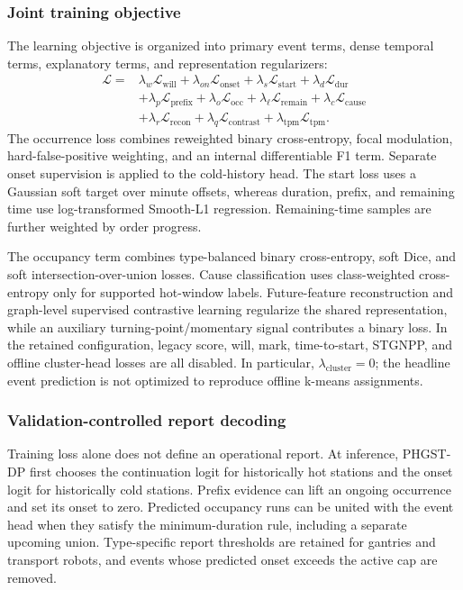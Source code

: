\documentclass[a4paper,fleqn]{cas-dc}
\begin{document}
\subsubsection{Joint training objective}

The learning objective is organized into primary event terms, dense temporal terms, explanatory terms, and representation regularizers:
\begin{equation}
\begin{aligned}
\mathcal{L}={}&
\lambda_w\mathcal{L}_{\mathrm{will}}+
\lambda_{on}\mathcal{L}_{\mathrm{onset}}+
\lambda_s\mathcal{L}_{\mathrm{start}}+
\lambda_d\mathcal{L}_{\mathrm{dur}}\\
&+\lambda_p\mathcal{L}_{\mathrm{prefix}}+
\lambda_o\mathcal{L}_{\mathrm{occ}}+
\lambda_{\ell}\mathcal{L}_{\mathrm{remain}}+
\lambda_c\mathcal{L}_{\mathrm{cause}}\\
&+\lambda_r\mathcal{L}_{\mathrm{recon}}+
\lambda_q\mathcal{L}_{\mathrm{contrast}}+
\lambda_{\mathrm{tpm}}\mathcal{L}_{\mathrm{tpm}} .
\end{aligned}
\end{equation}
The occurrence loss combines reweighted binary cross-entropy, focal modulation, hard-false-positive weighting, and an internal differentiable F1 term. Separate onset supervision is applied to the cold-history head. The start loss uses a Gaussian soft target over minute offsets, whereas duration, prefix, and remaining time use log-transformed Smooth-L1 regression. Remaining-time samples are further weighted by order progress.


The occupancy term combines type-balanced binary cross-entropy, soft Dice, and soft intersection-over-union losses. Cause classification uses class-weighted cross-entropy only for supported hot-window labels. Future-feature reconstruction and graph-level supervised contrastive learning regularize the shared representation, while an auxiliary turning-point/momentary signal contributes a binary loss. In the retained configuration, legacy score, will, mark, time-to-start, STGNPP, and offline cluster-head losses are all disabled. In particular, $\lambda_{\mathrm{cluster}}=0$; the headline event prediction is not optimized to reproduce offline k-means assignments.


\subsubsection{Validation-controlled report decoding}

Training loss alone does not define an operational report. At inference, PHGST-DP first chooses the continuation logit for historically hot stations and the onset logit for historically cold stations. Prefix evidence can lift an ongoing occurrence and set its onset to zero. Predicted occupancy runs can be united with the event head when they satisfy the minimum-duration rule, including a separate upcoming union. Type-specific report thresholds are retained for gantries and transport robots, and events whose predicted onset exceeds the active cap are removed.
\end{document}
